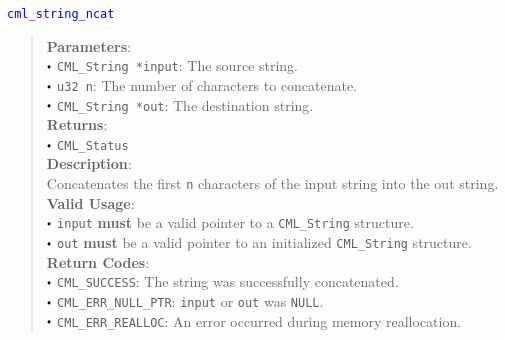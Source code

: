 \documentclass[a4paper,oneside,10pt]{article}
\newcommand{\function}[1]{
  \noindent\textcolor{blue}{\texttt{#1}}
  \vspace{-0.3em}
}
\renewcommand{\dot}{\raisebox{0.3ex}{\scalebox{0.6}{$\bullet$}}}
\theoremstyle{definition}
\begin{document}
\function{cml\_string\_ncat}
\begin{quote}
  \textbf{Parameters}: \\
  $\dot$ \texttt{CML\_String *input}: The source string. \\
  $\dot$ \texttt{u32 n}: The number of characters to concatenate. \\
  $\dot$ \texttt{CML\_String *out}: The destination string. \\
  \textbf{Returns}: \\
  $\dot$ \texttt{CML\_Status} \\

  \vspace{-0.75em}
  \textbf{Description}: \\
  Concatenates the first \texttt{n} characters of the input string into the out string. \\

  \vspace{-0.75em}
  \textbf{Valid Usage}: \\
  $\dot$ \texttt{input} \textbf{must} be a valid pointer to a \texttt{CML\_String} structure. \\
  $\dot$ \texttt{out} \textbf{must} be a valid pointer to an initialized \texttt{CML\_String} structure. \\

  \vspace{-0.75em}
  \textbf{Return Codes}: \\
  $\dot$ \texttt{CML\_SUCCESS}: The string was successfully concatenated. \\
  $\dot$ \texttt{CML\_ERR\_NULL\_PTR}: \texttt{input} or \texttt{out} was \texttt{NULL}. \\
  $\dot$ \texttt{CML\_ERR\_REALLOC}: An error occurred during memory reallocation. \\
\end{quote}
\end{document}
